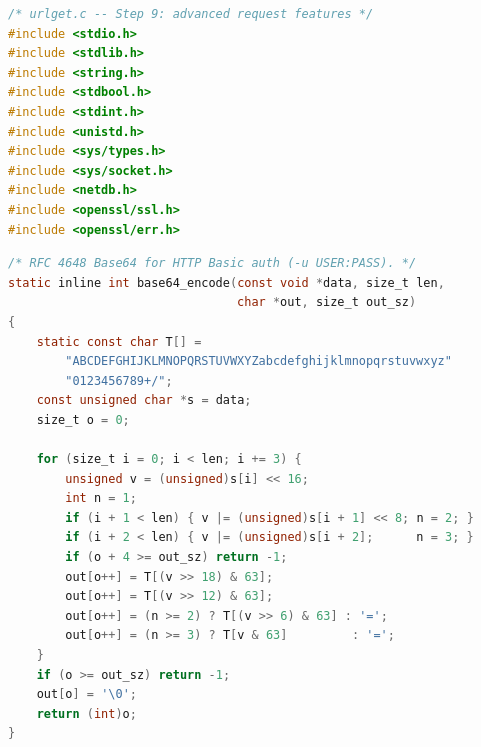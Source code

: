 \begin{lstlisting}[style=oldcode,language=C,firstnumber=1]
/* urlget.c -- Step 9: advanced request features */
#include <stdio.h>
#include <stdlib.h>
#include <string.h>
#include <stdbool.h>
#include <stdint.h>
#include <unistd.h>
#include <sys/types.h>
#include <sys/socket.h>
#include <netdb.h>
#include <openssl/ssl.h>
#include <openssl/err.h>
\end{lstlisting}
\begin{lstlisting}[style=newcode,language=C,firstnumber=last]
/* RFC 4648 Base64 for HTTP Basic auth (-u USER:PASS). */
static inline int base64_encode(const void *data, size_t len,
                                char *out, size_t out_sz)
{
    static const char T[] =
        "ABCDEFGHIJKLMNOPQRSTUVWXYZabcdefghijklmnopqrstuvwxyz"
        "0123456789+/";
    const unsigned char *s = data;
    size_t o = 0;

    for (size_t i = 0; i < len; i += 3) {
        unsigned v = (unsigned)s[i] << 16;
        int n = 1;
        if (i + 1 < len) { v |= (unsigned)s[i + 1] << 8; n = 2; }
        if (i + 2 < len) { v |= (unsigned)s[i + 2];      n = 3; }
        if (o + 4 >= out_sz) return -1;
        out[o++] = T[(v >> 18) & 63];
        out[o++] = T[(v >> 12) & 63];
        out[o++] = (n >= 2) ? T[(v >> 6) & 63] : '=';
        out[o++] = (n >= 3) ? T[v & 63]         : '=';
    }
    if (o >= out_sz) return -1;
    out[o] = '\0';
    return (int)o;
}
\end{lstlisting}
